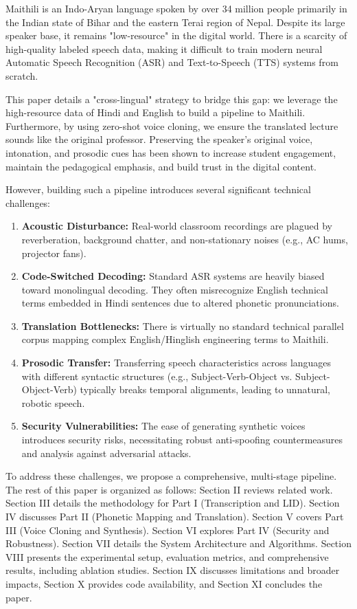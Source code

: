 \documentclass[conference]{IEEEtran}
\begin{document}
Maithili is an Indo-Aryan language spoken by over 34 million people primarily in the Indian state of Bihar and the eastern Terai region of Nepal. Despite its large speaker base, it remains "low-resource" in the digital world. There is a scarcity of high-quality labeled speech data, making it difficult to train modern neural Automatic Speech Recognition (ASR) and Text-to-Speech (TTS) systems from scratch. 

This paper details a "cross-lingual" strategy to bridge this gap: we leverage the high-resource data of Hindi and English to build a pipeline to Maithili. Furthermore, by using zero-shot voice cloning, we ensure the translated lecture sounds like the original professor. Preserving the speaker's original voice, intonation, and prosodic cues has been shown to increase student engagement, maintain the pedagogical emphasis, and build trust in the digital content.

However, building such a pipeline introduces several significant technical challenges:
\begin{enumerate}
    \item \textbf{Acoustic Disturbance:} Real-world classroom recordings are plagued by reverberation, background chatter, and non-stationary noises (e.g., AC hums, projector fans).
    \item \textbf{Code-Switched Decoding:} Standard ASR systems are heavily biased toward monolingual decoding. They often misrecognize English technical terms embedded in Hindi sentences due to altered phonetic pronunciations.
    \item \textbf{Translation Bottlenecks:} There is virtually no standard technical parallel corpus mapping complex English/Hinglish engineering terms to Maithili.
    \item \textbf{Prosodic Transfer:} Transferring speech characteristics across languages with different syntactic structures (e.g., Subject-Verb-Object vs. Subject-Object-Verb) typically breaks temporal alignments, leading to unnatural, robotic speech.
    \item \textbf{Security Vulnerabilities:} The ease of generating synthetic voices introduces security risks, necessitating robust anti-spoofing countermeasures and analysis against adversarial attacks.
\end{enumerate}

To address these challenges, we propose a comprehensive, multi-stage pipeline. The rest of this paper is organized as follows: Section II reviews related work. Section III details the methodology for Part I (Transcription and LID). Section IV discusses Part II (Phonetic Mapping and Translation). Section V covers Part III (Voice Cloning and Synthesis). Section VI explores Part IV (Security and Robustness). Section VII details the System Architecture and Algorithms. Section VIII presents the experimental setup, evaluation metrics, and comprehensive results, including ablation studies. Section IX discusses limitations and broader impacts, Section X provides code availability, and Section XI concludes the paper.
\end{document}
